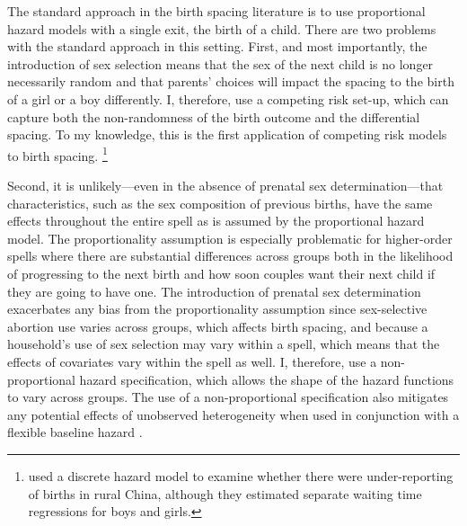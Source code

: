 \documentclass[12pt,letterpaper]{article}
\begin{document}

The standard approach in the birth spacing literature is to use proportional hazard
models with a single exit, the birth of a child.
There are two problems with the standard approach in this setting.
First, and most importantly, the introduction of sex selection means that the sex of the 
next child is no longer necessarily random and that parents' choices will impact the 
spacing to the birth of a girl or a boy differently.
I, therefore, use a competing risk set-up, which can capture both the non-randomness of
the birth outcome and the differential spacing.
To my knowledge, this is the first application of competing risk models to birth
spacing.%
\footnote{
\cite{Merli2000} used a discrete hazard model to examine whether 
there were under-reporting of births in rural China, although they 
estimated separate waiting time regressions for boys and girls.
}

Second, it is unlikely---even in the absence of prenatal sex determination---that 
characteristics, such as the sex composition of previous births, have the same effects 
throughout the entire spell as is assumed by the proportional hazard model.
The proportionality assumption is especially problematic for higher-order spells where 
there are substantial differences across groups both in the likelihood of progressing to 
the next birth and how soon couples want their next child if they are going to have one.
The introduction of prenatal sex determination exacerbates any bias from the 
proportionality assumption since sex-selective abortion use varies across groups,
which affects birth spacing, and because a household's use of sex selection may vary 
within a spell, which means that the effects of covariates vary within the spell as well.
I, therefore, use a non-proportional hazard specification, which allows the shape of the 
hazard functions to vary across groups.
The use of a non-proportional specification also mitigates any potential effects 
of unobserved heterogeneity when used in conjunction with a flexible baseline hazard 
\citep{Dolton1995}.
\end{document}
